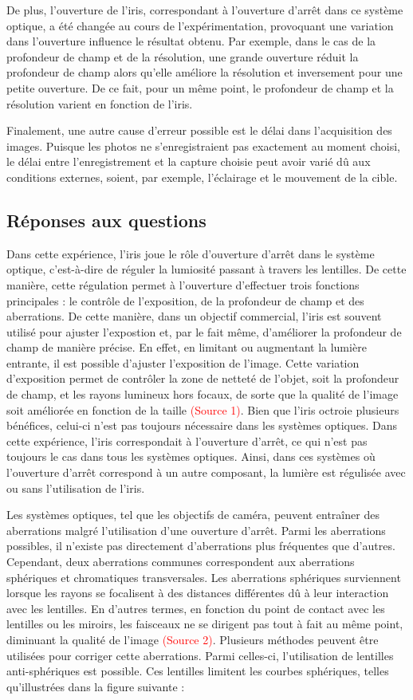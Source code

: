 \documentclass[11pt,letterpaper]{article}
\begin{document}
De plus, l'ouverture de l'iris, correspondant à l'ouverture d'arrêt dans ce système optique, a été changée au cours de l'expérimentation, provoquant une variation dans l'ouverture influence le résultat obtenu. Par exemple, dans le cas de la profondeur de champ et de la résolution, une grande ouverture réduit la profondeur de champ alors qu'elle améliore la résolution et inversement pour une petite ouverture. De ce fait, pour un même point, le profondeur de champ et la résolution varient en fonction de l'iris.

Finalement, une autre cause d'erreur possible est le délai dans l'acquisition des images. Puisque les photos ne s'enregistraient pas exactement au moment choisi, le délai entre l'enregistrement et la capture choisie peut avoir varié dû aux conditions externes, soient, par exemple, l'éclairage et le mouvement de la cible.

\subsection{Réponses aux questions}
Dans cette expérience, l'iris joue le rôle d'ouverture d'arrêt dans le système optique, c'est-à-dire de réguler la lumiosité passant à travers les lentilles. De cette manière, cette régulation permet à l'ouverture d'effectuer trois fonctions principales : le contrôle de l'exposition, de la profondeur de champ et des aberrations. De cette manière, dans un objectif commercial, l'iris est souvent utilisé pour ajuster l'expostion et, par le fait même, d'améliorer la profondeur de champ de manière précise. En effet, en limitant ou augmentant la lumière entrante, il est possible d'ajuster l'exposition de l'image. Cette variation d'exposition permet de contrôler la zone de netteté de l'objet, soit la profondeur de champ, et les rayons lumineux hors focaux, de sorte que la qualité de l'image soit améliorée en fonction de la taille \textcolor{red}{(Source 1)}. Bien que l'iris octroie plusieurs bénéfices, celui-ci n'est pas toujours nécessaire dans les systèmes optiques. Dans cette expérience, l'iris correspondait à l'ouverture d'arrêt, ce qui n'est pas toujours le cas dans tous les systèmes optiques. Ainsi, dans ces systèmes où l'ouverture d'arrêt correspond à un autre composant, la lumière est régulisée avec ou sans l'utilisation de l'iris.

Les systèmes optiques, tel que les objectifs de caméra, peuvent entraîner des aberrations malgré l'utilisation d'une ouverture d'arrêt. Parmi les aberrations possibles, il n'existe pas directement d'aberrations plus fréquentes que d'autres. Cependant, deux aberrations communes correspondent aux aberrations sphériques et chromatiques transversales. Les aberrations sphériques surviennent lorsque les rayons se focalisent à des distances différentes dû à leur interaction avec les lentilles. En d'autres termes, en fonction du point de contact avec les lentilles ou les miroirs, les faisceaux ne se dirigent pas tout à fait au même point, diminuant la qualité de l'image \textcolor{red}{(Source 2)}. Plusieurs méthodes peuvent être utilisées pour corriger cette aberrations. Parmi celles-ci, l'utilisation de lentilles anti-sphériques est possible. Ces lentilles limitent les courbes sphériques, telles qu'illustrées dans la figure suivante :
\end{document}
